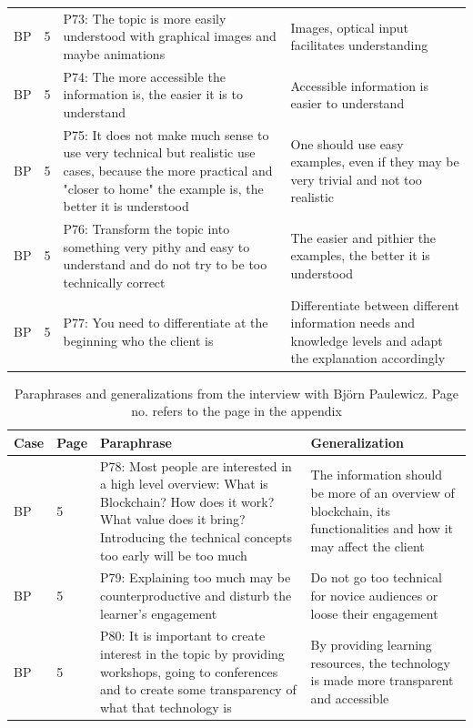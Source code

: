 \begin{table}[H]
\begin{tabularx}{\textwidth}{ll|X|p{4.5cm}}
	BP & 5 & P73: The topic is more easily understood with graphical images and maybe animations & Images, optical input facilitates understanding   \\ 
	BP & 5 & P74: The more accessible the information is, the easier it is to understand & Accessible information is easier to understand   \\ 
	BP & 5 & P75: It does not make much sense to use very technical but realistic use cases, because the more practical and "closer to home" the example is, the better it is understood & One should use easy examples, even if they may be very trivial and not too realistic   \\ 
	BP & 5 & P76: Transform the topic into something very pithy and easy to understand and do not try to be too technically correct & The easier and pithier the examples, the better it is understood   \\ 
	BP & 5 & P77: You need to differentiate at the beginning who the client is & Differentiate between different information needs and knowledge levels and adapt the explanation accordingly   \\ 
	\end{tabularx}
    \label{tab:my_label2}
\end{table}

\begin{table}[H]
    \centering
    \begin{tabularx}{\textwidth}{ll|X|p{4.5cm}}
    Case & Page & Paraphrase & Generalization  \\ \hline
	BP & 5 & P78: Most people are interested in a high level overview: What is Blockchain? How does it work? What value does it bring? Introducing the technical concepts too early will be too much & The information should be more of an overview of blockchain, its functionalities and how it may affect the client   \\ 
	BP & 5 & P79: Explaining too much may be counterproductive and disturb the learner's engagement & Do not go too technical for novice audiences or loose their engagement   \\ 
	BP & 5 & P80: It is important to create interest in the topic by providing workshops, going to conferences and to create some transparency of what that technology is & By providing learning resources, the technology is made more transparent and accessible   \\ 
    \end{tabularx}
    \caption{Paraphrases and generalizations from the interview with Björn Paulewicz. Page no. refers to the page in the appendix}
    \label{tab:my_label3}
\end{table}


